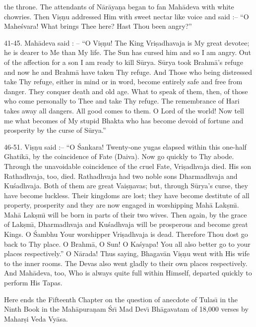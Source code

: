 the throne. The attendants of N\=ar\=aya\d{n}a began to fan Mah\=adeva with white chowries. Then Vi\d{s}\d{n}u addressed Him with sweet nectar like voice and said :-- ``O Mahe\'svara! What brings Thee here? Hast Thou been angry?''

41-45. Mah\=adeva said : -- ``O Vi\d{s}\d{n}u! The King Vri\d{s}adhavaja is My great devotee; he is dearer to Me than My life. The Sun has cursed him and so I am angry. Out of the affection for a son I am ready to kill S\=urya. S\=urya took Brahm\=a's refuge and now he and Brahm\=a have taken Thy refuge. And Those who being distressed take Thy refuge, either in mind or in word, become entirely safe and free from danger. They conquer death and old age. What to speak of them, then, of those who come personally to Thee and take Thy refuge. The remembrance of Hari takes away all dangers. All good comes to them. O Lord of the world! Now tell me what becomes of My stupid Bhakta who has become devoid of fortune and prosperity by the curse of S\=urya.''

46-51. Vi\d{s}\d{n}u said :-- ``O \'Sankara! Twenty-one yugas elapsed within this one-half Ghatik\=a, by the coincidence of Fate (Daiva). Now go quickly to Thy abode. Through the unavoidable coincidence of the cruel Fate, Vri\d{s}adhvaja died. His son Rathadhvaja, too, died. Rathadhvaja had two noble sons Dharmadhvaja and Ku\'sadhvaja. Both of them are great Vai\d{s}\d{n}avas; but, through S\=urya's curse, they have become luckless. Their kingdoms are lost; they have become destitute of all property, prosperity and they are now engaged in worshipping Mah\=a Lak\d{s}m\={\i}. Mah\=a Lak\d{s}m\={\i} will be born in parts of their two wives. Then again, by the grace of Lak\d{s}m\={\i}, Dharmadhvaja and Ku\'sadhvaja will be prosperous and become great Kings. O \'Sambhu Your worshipper Vri\d{s}adhvaja is dead. Therefore Thou dost go back to Thy place. O Brahm\=a, O Sun! O Ka\'syapa! You all also better go to your places respectively.'' O N\=arada! Thus saying, Bhagav\=an Vi\d{s}\d{n}u went with His wife to the inner rooms. The Devas also went gladly to their own places respectively. And Mah\=adeva, too, Who is always quite full within Himself, departed quickly to perform His Tapas.

Here ends the Fifteenth Chapter on the question of anecdote of Tulas\={\i} in the Ninth Book in the Mah\=apura\d{n}am \'Sr\={\i} Mad Dev\={\i} Bh\=agavatam of 18,000 verses by Mahar\d{s}i Veda Vy\=asa.



